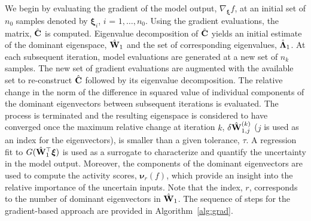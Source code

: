 We begin by evaluating the gradient of the model output, $\nabla_{\bm{\xi}}f$,
at an initial set of $n_0$ samples denoted by $\bm{\xi}_i$, $i$ = $1,\ldots,n_0$.
Using the gradient
evaluations, the matrix, $\hat{\mathbf{{C}}}$ is computed. Eigenvalue decomposition
of $\hat{\mathbf{{C}}}$ yields an initial estimate of the dominant eigenspace,
$\hat{\mathbf{{W}}}_1$ and the set of corresponding eigenvalues, 
$\hat{\mathbf{{\Lambda}}}_1$.
 At each subsequent iteration, model evaluations are
generated at a new set of $n_k$ samples. The new set of gradient evaluations
are augmented with the available set to re-construct $\hat{\mathbf{{C}}}$ followed
by its eigenvalue decomposition. The relative change in the norm of the
difference in squared value of individual components of the dominant
eigenvectors between subsequent iterations is evaluated. The process is
terminated and the resulting eigenspace is considered to have converged once
the maximum relative change at iteration $k$, $\delta \hat{\mathbf{{W}}}_{1,j}^{(k)}$
($j$ is used as an index for the eigenvectors),
is smaller than a given tolerance, $\tau$.  A regression fit to
$G(\hat{\mathbf{{W}}}_1^\top\bm{\xi})$ is used as a surrogate to characterize and
quantify the uncertainty in the model output. Moreover, the components of the
dominant eigenvectors are used to compute the activity scores, $\bm{\nu}_r(f)$,
which provide an insight into the relative importance of the uncertain inputs.
Note that the index, $r$, corresponds to the number of dominant eigenvectors in
$\hat{\mathbf{{W}}}_1$. The sequence of steps for the gradient-based approach are
provided in Algorithm~\ref{alg:grad}.


